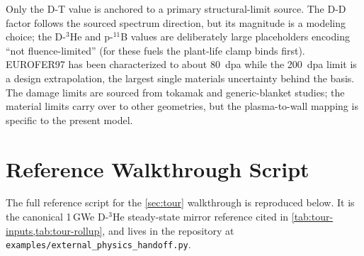 \documentclass{article}
\begin{document}
Only the D-T value is anchored to a primary structural-limit source. The D-D
factor follows the sourced spectrum direction, but its magnitude is a modeling
choice; the D-${}^3$He and p-${}^{11}$B values are deliberately large
placeholders encoding ``not fluence-limited'' (for these fuels the plant-life
clamp binds first). EUROFER97 has been characterized to about 80~dpa
\citep{gaganidze2012} while the
200~dpa limit is a design extrapolation, the largest single materials
uncertainty behind the basis. The damage limits are sourced from tokamak and
generic-blanket studies; the material limits carry over to other geometries,
but the plasma-to-wall mapping is specific to the present model.

\section{Reference Walkthrough Script}
\label{sec:appendix-handoff-script}

The full reference script for the \cref{sec:tour} walkthrough is
reproduced below. It is the canonical 1\,GWe D-${}^3$He steady-state
mirror reference cited in \cref{tab:tour-inputs,tab:tour-rollup}, and
lives in the repository at
\texttt{examples/external\_physics\_handoff.py}.






\end{document}
